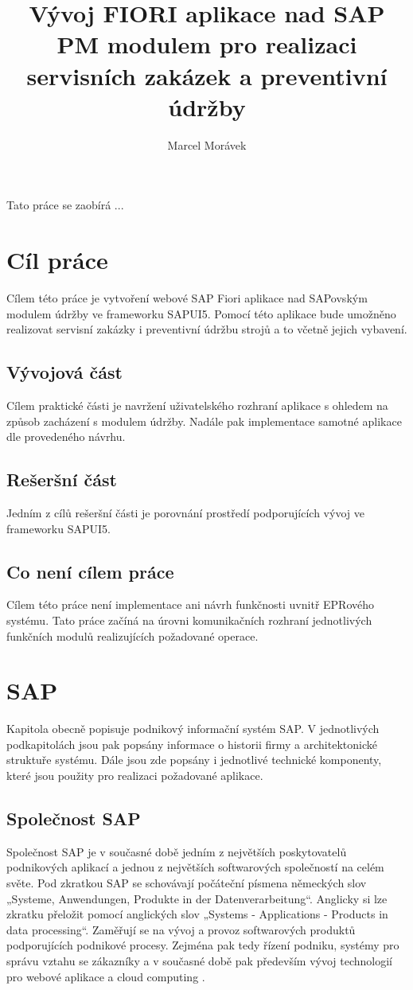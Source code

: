 \documentclass[thesis=M,czech]{FITthesis}[2012/06/26]
\title{Vývoj FIORI aplikace nad SAP PM modulem pro realizaci servisních zakázek a preventivní údržby}
\author{Marcel Morávek} %
\begin{document}

\begin{introduction}
	Tato práce se zaobírá ...
\end{introduction}

\chapter{Cíl práce}
Cílem této práce je vytvoření webové SAP Fiori aplikace nad SAPovským modulem údržby ve frameworku SAPUI5. Pomocí této aplikace bude umožněno realizovat servisní zakázky i preventivní údržbu strojů a to včetně jejich vybavení.

\section{Vývojová část}
Cílem praktické části je navržení uživatelského rozhraní aplikace s ohledem na způsob zacházení s modulem údržby. Nadále pak implementace samotné aplikace dle provedeného návrhu. 

\section{Rešeršní část}
Jedním z cílů rešeršní části je porovnání prostředí podporujících vývoj ve frameworku SAPUI5. 

\section{Co není cílem práce}
Cílem této práce není implementace ani návrh funkčnosti uvnitř EPRového systému. Tato práce začíná na úrovni komunikačních rozhraní jednotlivých funkčních modulů realizujících požadované operace. 

\chapter{SAP}
Kapitola obecně popisuje podnikový informační systém SAP. V jednotlivých podkapitolách jsou pak popsány informace o historii firmy a architektonické struktuře systému. Dále jsou zde popsány i jednotlivé technické komponenty, které jsou použity pro realizaci požadované aplikace. 

\section{Společnost SAP}
Společnost SAP je v současné době jedním z největších poskytovatelů podnikových aplikací a jednou z největších softwarových společností na celém světe. Pod zkratkou SAP se schovávají počáteční písmena německých slov „Systeme, Anwendungen, Produkte in der Datenverarbeitung“. Anglicky si lze zkratku přeložit pomocí anglických slov „Systems - Applications - Products in data processing“. Zaměřují se na vývoj a provoz softwarových produktů podporujících podnikové procesy. Zejména pak tedy řízení podniku, systémy pro správu vztahu se zákazníky a v současné době pak především vývoj technologií pro webové aplikace a cloud computing \cite{sap_information}.
\end{document}
